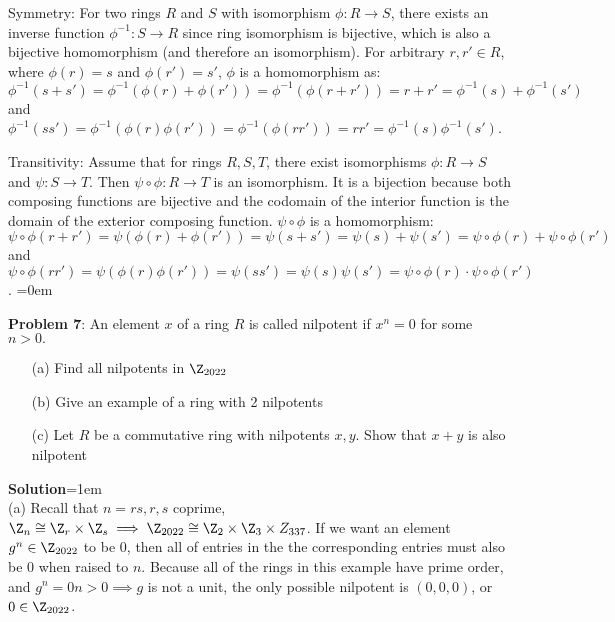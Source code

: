 \documentclass{article}
\begin{document}
Symmetry: For two rings $R$ and $S$ with isomorphism $\phi: R\to S$, there exists an inverse function $\phi^{-1}: S \to R$ since ring isomorphism is bijective, which is also a bijective homomorphism (and therefore an isomorphism). For arbitrary $r, r' \in R$, where $\phi(r) = s$ and $\phi(r') = s'$, $\phi$ is a homomorphism as: $\phi^{-1}(s + s') =\phi^{-1}(\phi(r) + \phi(r')) = \phi^{-1}(\phi(r + r')) = r + r' = \phi^{-1}(s) + \phi^{-1}(s')$\\
and \\
$\phi^{-1}(ss') =\phi^{-1}(\phi(r)\phi(r')) = \phi^{-1}(\phi(rr')) = rr' = \phi^{-1}(s)\phi^{-1}(s')$. 

Transitivity: Assume that for rings $R, S, T$, there exist isomorphisms $\phi: R \to S$ and $\psi: S \to T$. Then $\psi \circ \phi: R \to T$ is an isomorphism. It is a bijection because both composing functions are bijective and the codomain of the interior function is the domain of the exterior composing function. $\psi \circ \phi$ is a homomorphism:\\ $\psi \circ \phi(r + r') = \psi(\phi(r) + \phi(r')) = \psi(s + s') = \psi(s) + \psi(s') = \psi \circ \phi(r) + \psi \circ \phi(r')$\\
and \\
$\psi \circ \phi(rr') = \psi(\phi(r)\phi(r')) = \psi(ss') = \psi(s)\psi(s') = \psi \circ \phi(r)\cdot \psi \circ \phi(r')$.
\newpage\parskip=0em
\begin{mdframed}[backgroundcolor=blue!20]
\textbf{Problem 7}: An element $x$ of a ring $R$ is called nilpotent if $x^n = 0$ for some $n>0.$
\begin{itemize}
    \item[(a)] Find all nilpotents in $\Z_{2022}$
    \item[(b)] Give an example of a ring with 2 nilpotents
    \item[(c)] Let $R$ be a commutative ring with nilpotents $x, y$. Show that $x +y$ is also nilpotent
\end{itemize}
\end{mdframed}
\textbf{Solution}\parskip=1em\\
(a) Recall that $n = rs, r, s$ coprime, $\Z_{n} \cong \Z_r \times \Z_s \implies \Z_{2022} \cong \Z_2 \times \Z_3 \times Z_{337}$. If we want an element $g^n \in \Z_{2022}$ to be 0, then all of entries in the the corresponding entries must also be 0 when raised to $n$. Because all of the rings in this example have prime order, and $g^n = 0 n>0\implies g$ is not a unit, the only possible nilpotent is $(0, 0, 0)$, or $0 \in \Z_{2022}$.
\end{document}

